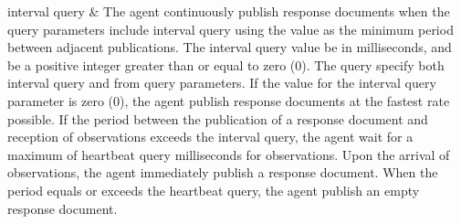 \begin{longtabu}
\gls{interval query}
&
The \gls{agent} \MUST continuously publish \glspl{response document} when the query parameters include \gls{interval query} using the value as the minimum period between adjacent publications.
\newline The \gls{interval query} value \MUST be in milliseconds, and \MUST be a positive integer greater than or equal to zero (0).
\newline The \gls{query} \MUSTNOT specify both \gls{interval query} and \gls{from query} parameters.
\newline If the value for the \gls{interval query} parameter is zero (0), the \gls{agent} \MUST publish  \glspl{response document} at the fastest rate possible.
\newline If the period between the publication of a \gls{response document} and reception of \glspl{observation} exceeds the \gls{interval query}, the \gls{agent} \MUST wait for a maximum of \gls{heartbeat query} milliseconds for \glspl{observation}. Upon the arrival of \glspl{observation}, the \gls{agent} \MUST immediately publish a \gls{response document}. When the period equals or exceeds the \gls{heartbeat query}, the \gls{agent} \MUST publish an empty \gls{response document}. \\
\hline


\end{longtabu}
